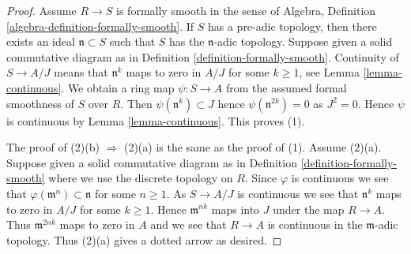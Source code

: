 \documentclass[10pt,a4paper]{amsart}
\theoremstyle{plain}
\theoremstyle{definition}
\theoremstyle{remark}
\numberwithin{equation}{subsection}
\begin{document}
\begin{proof}
Assume $R \to S$ is formally smooth in
the sense of Algebra, Definition \ref{algebra-definition-formally-smooth}.
If $S$ has a pre-adic topology, then
there exists an ideal $\mathfrak n \subset S$ such that $S$ has the
$\mathfrak n$-adic topology. Suppose given a solid commutative diagram as in
Definition \ref{definition-formally-smooth}.
Continuity of $S \to A/J$ means that $\mathfrak n^k$ maps to zero
in $A/J$ for some $k \geq 1$, see Lemma \ref{lemma-continuous}.
We obtain a ring map $\psi : S \to A$ from the assumed formal smoothness of
$S$ over $R$. Then $\psi(\mathfrak n^k) \subset J$ hence
$\psi(\mathfrak n^{2k}) = 0$ as $J^2 = 0$. Hence $\psi$ is continuous by
Lemma \ref{lemma-continuous}. This proves (1).

\medskip\noindent
The proof of (2)(b) $\Rightarrow$ (2)(a) is the same as the proof of (1).
Assume (2)(a). Suppose given a solid commutative diagram as in
Definition \ref{definition-formally-smooth} where we use the discrete
topology on $R$. Since $\varphi$ is continuous we see that
$\varphi(\mathfrak m^n) \subset \mathfrak n$ for some $n \geq 1$.
As $S \to A/J$ is continuous we see that $\mathfrak n^k$ maps to
zero in $A/J$ for some $k \geq 1$. Hence $\mathfrak m^{nk}$ maps
into $J$ under the map $R \to A$. Thus $\mathfrak m^{2nk}$ maps to zero
in $A$ and we see that $R \to A$ is continuous in the $\mathfrak m$-adic
topology. Thus (2)(a) gives a dotted arrow as desired.
\end{proof}
\end{document}
